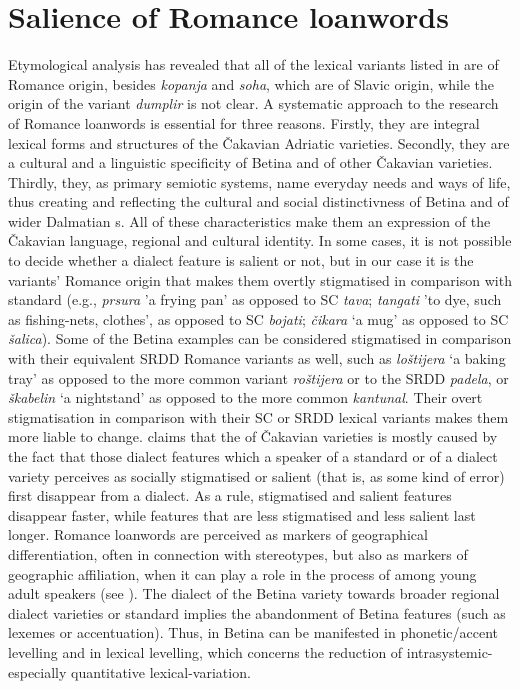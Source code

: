 \documentclass[output=paper]{LSP/langsci}
\begin{document}
\largerpage
\section{Salience of Romance loanwords}
Etymological analysis has revealed that all of the lexical variants listed in  are of Romance origin, besides \textit{kopanja} and \textit{soha}, which are of Slavic origin, while the origin of the variant \textit{dumplir} is not clear. A systematic approach to the research of Romance loanwords is essential for three reasons. Firstly, they are integral lexical forms and structures of the Čakavian  Adriatic varieties. Secondly, they are a cultural and a linguistic specificity of Betina and of other Čakavian varieties. Thirdly, they, as primary semiotic systems, name everyday needs and ways of life, thus creating and reflecting the cultural and social distinctivness of Betina and of wider Dalmatian s. All of these characteristics make them an expression of the Čakavian language, regional and cultural identity. In some cases, it is not possible to decide whether a dialect feature is salient or not, but in our case it is the variants’ Romance origin that makes them overtly stigmatised in comparison with standard  (e.g., \textit{prsura} 'a frying pan' as opposed to SC \textit{tava}; \textit{tangati} 'to dye, such as fishing-nets, clothes’, as opposed to SC \textit{bojati}; \textit{čikara} ‘a mug’ as opposed to SC \textit{šalica}). Some of the Betina examples can be considered stigmatised in comparison with their equivalent SRDD Romance variants as well, such as \textit{loštijera} ‘a baking tray’ as opposed to the more common variant \textit{roštijera} or to the SRDD \textit{padela}, or \textit{škabelin} ‘a nightstand’ as opposed to the more common \textit{kantunal}. Their overt stigmatisation in comparison with their SC or SRDD lexical variants makes them more liable to change. \citet[30--32]{jutronic_spliski_2010} claims that the  of Čakavian varieties is mostly caused by the fact that those dialect features which a speaker of a standard or of a dialect variety perceives as socially stigmatised or salient (that is, as some kind of error) first disappear from a dialect. As a rule, stigmatised and salient features disappear faster, while features that are less stigmatised and less salient last longer. Romance loanwords are perceived as markers of geographical differentiation, often in connection with stereotypes, but also as markers of geographic affiliation, when it can play a role in the process of  among young adult speakers (see \citealt[44--45]{auer_study_2004}). The dialect  of the Betina variety towards broader regional dialect varieties or standard  implies the abandonment of Betina features (such as lexemes or accentuation). Thus,  in Betina can be manifested in phonetic/accent levelling and in lexical levelling, which concerns the reduction of intrasystemic-especially quantitative lexical-variation.
\end{document}
